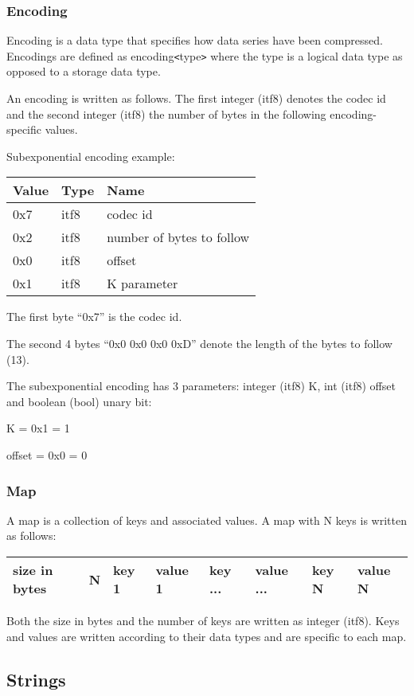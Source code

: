 \documentclass[a4paper]{article}
\begin{document}
\subsubsection*{Encoding}

Encoding is a data type that specifies how data series have been compressed. Encodings 
are defined as encoding\texttt{<}type\texttt{>} where the type is a logical data 
type as opposed to a storage data type.

An encoding is written as follows. The first integer (itf8) denotes the codec id 
and the second integer (itf8) the number of bytes in the following encoding-specific 
values. 

Subexponential encoding example: 

\begin{tabular}{|l|l|l|}
\hline
\textbf{Value} & \textbf{Type} & \textbf{Name}\tabularnewline
\hline
0x7 & itf8 & codec id\tabularnewline
\hline
0x2 & itf8 & number of bytes to follow\tabularnewline
\hline
0x0 & itf8 & offset\tabularnewline
\hline
0x1 & itf8 & K parameter\tabularnewline
\hline
\end{tabular}

The first byte ``0x7'' is the codec id. 

The second 4 bytes ``0x0 0x0 0x0 0xD'' denote the length of the bytes to follow 
(13). 

The subexponential encoding has 3 parameters: integer (itf8) K, int (itf8) offset 
and boolean (bool) unary bit: 

K = 0x1 = 1

offset = 0x0 = 0

\subsubsection*{Map}

A map is a collection of keys and associated values. A map with N keys is written 
as follows: 

\begin{tabular}{|l|l|l|l|l|l|l|l|}
\hline
size in bytes & N & key 1 & value 1 & key ... & value ... & key N & value N\tabularnewline
\hline
\end{tabular}

Both the size in bytes and the number of keys are written as integer (itf8). Keys 
and values are written according to their data types and are specific to each map.

\subsection{\textbf{Strings}}
\end{document}
